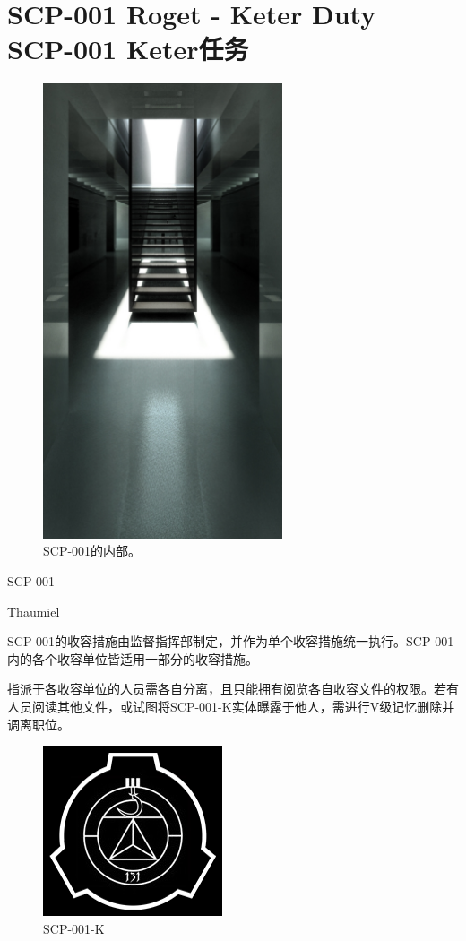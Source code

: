 \chapter[SCP-001 Keter任务]{
	SCP-001 Roget - Keter Duty \\
	SCP-001 Keter任务
}

\label{chap:SCP-001.keter.duty}

\begin{figure}[H]
	\centering
	\includegraphics[width=200pt]{images/SCP.001.keter.duty.1.jpg}
	\caption*{SCP-001的内部。}
\end{figure}

SCP-001

Thaumiel

SCP-001的收容措施由监督指挥部制定，并作为单个收容措施统一执行。SCP-001内的各个收容单位皆适用一部分的收容措施。

指派于各收容单位的人员需各自分离，且只能拥有阅览各自收容文件的权限。若有人员阅读其他文件，或试图将SCP-001-K实体曝露于他人，需进行V级记忆删除并调离职位。


\begin{figure}[H]
	\captionsetup{singlelinecheck=false}
	\caption*{SCP-001-K}
	\includegraphics{images/SCP.001.keter.duty.2.png}
\end{figure}

